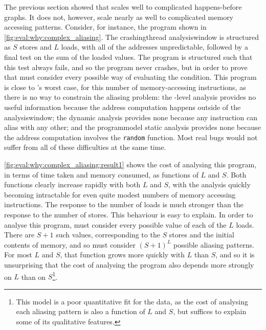 The previous section showed that {\technique} scales well to
complicated happens-before graphs.  It does not, however, scale nearly
as well to complicated memory accessing patterns.  Consider, for
instance, the program shown in
\autoref{fig:eval:why:complex_aliasing}.  The \gls{crashingthread}
\gls{analysiswindow} is structured as $S$ stores and $L$ loads, with
all of the addresses unpredictable, followed by a final test on the
sum of the loaded values.  The program is structured such that this
test always fails, and so the program never crashes, but in order to
prove that {\technique} must consider every possible way of evaluating
the condition.  This program is close to {\technique}'s worst case,
for this number of memory-accessing instructions, as there is no way
to constrain the aliasing problem: the {\StateMachine}-level analysis
provides no useful information because the address computation happens
outside of the \gls{analysiswindow}; the dynamic analysis provides
none because any instruction can alias with any other; and the
\gls{programmodel} static analysis provides none because the address
computation involves the \texttt{random} function.  Most real bugs
would not suffer from all of these difficulties at the same time.

\autoref{fig:eval:why:complex_aliasing:result1} shows the cost of
analysing this program, in terms of time taken and memory consumed, as
functions of $L$ and $S$.  Both functions clearly increase rapidly
with both $L$ and $S$, with the analysis quickly becoming intractable
for even quite modest numbers of memory accessing instructions.  The
response to the number of loads is much stronger than the response to
the number of stores.  This behaviour is easy to explain.  In order to
analyse this program, {\technique} must consider every possible value
of each of the $L$ loads.  There are $S+1$ such values, corresponding
to the $S$ stores and the initial contents of memory, and so
{\technique} must consider $(S+1)^L$ possible aliasing patterns.  For
most $L$ and $S$, that function grows more quickly with $L$ than $S$,
and so it is unsurprising that the cost of analysing the program also
depends more strongly on $L$ than on $S$\footnote{This model is a poor
  quantitative fit for the data, as the cost of analysing each
  aliasing pattern is also a function of $L$ and $S$, but suffices to
  explain some of its qualitative features.}.

